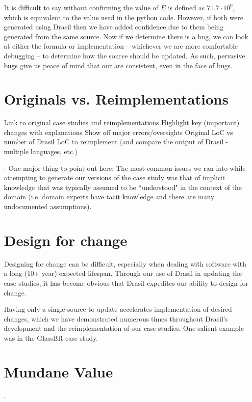 It is difficult to say without confirming the value of $E$ is defined as 
$71.7\cdot{}10^{9}$, which is equivalent to the value used in the python code. 
However, if both \sfs{} were generated using Drasil then we have added 
confidence due to them being generated from the same source. Now if we 
determine there is a bug, we can look at either the formula or implementation 
-- whichever we are more comfortable debugging -- to determine how the source 
should be updated. As such, pervasive bugs give us peace of mind that our 
\sfs{} are consistent, even in the face of bugs.

\section{Originals vs. Reimplementations}
	Link to original case studies and reimplementations
	Highlight key (important) changes with explanations
	Show off major errors/oversights
	Original \sfs{} LoC vs number of Drasil LoC to reimplement (and compare the 
	output of Drasil - multiple languages, etc.)

- One major thing to point out here: The most common issues we ran into while 
attempting to generate our versions of the case study \sfs{} was that of 
implicit knowledge that was typically assumed to be ``understood" in the 
context of the domain (i.e. domain experts have tacit knowledge and there are 
many undocumented assumptions).

\section{Design for change}

Designing for change can be difficult, especially when dealing with software 
with a long (10+ year) expected lifespan. Through our use of Drasil in updating 
the case studies, it has become obvious that Drasil expedites our ability to 
design for change.

Having only a single source to update accelerates implementation of desired 
changes, which we have demonstrated numerous times throughout Drasil's 
development and the reimplementation of our case studies. One salient example 
was in the GlassBR case study.


\section {Mundane Value}
.

